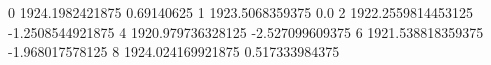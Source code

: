 0 1924.1982421875 0.69140625
1 1923.5068359375 0.0
2 1922.2559814453125 -1.2508544921875
4 1920.979736328125 -2.527099609375
6 1921.538818359375 -1.968017578125
8 1924.024169921875 0.517333984375
